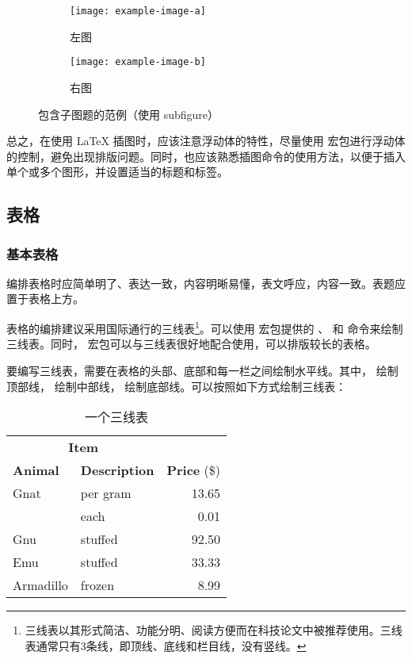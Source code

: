 \begin{figure}[!htp]
  \centering
  \begin{subfigure}{0.3\textwidth}
    \centering
    \texttt{[image: example-image-a]}
    \caption{左图}
  \end{subfigure}
  \hspace{1cm}
  \begin{subfigure}{0.4\textwidth}
    \centering
    \texttt{[image: example-image-b]}
    \caption{右图}
  \end{subfigure}
  \caption{包含子图题的范例（使用 subfigure）}
  \label{fig:subfigure}
\end{figure}



总之，在使用 \LaTeX{} 插图时，应该注意浮动体的特性，尽量使用  宏包进行浮动体的控制，避免出现排版问题。同时，也应该熟悉插图命令的使用方法，以便于插入单个或多个图形，并设置适当的标题和标签。


\subsection{表格}

\subsubsection{基本表格}

编排表格时应简单明了、表达一致，内容明晰易懂，表文呼应，内容一致。表题应置于表格上方。

表格的编排建议采用国际通行的三线表\footnote{三线表以其形式简洁、功能分明、阅读方便而在科技论文中被推荐使用。三线表通常只有3条线，即顶线、底线和栏目线，没有竖线。}。可以使用  宏包提供的 、 和  命令来绘制三线表。同时， 宏包可以与三线表很好地配合使用，可以排版较长的表格。

要编写三线表，需要在表格的头部、底部和每一栏之间绘制水平线。其中， 绘制顶部线， 绘制中部线， 绘制底部线。可以按照如下方式绘制三线表：
\begin{table}[!hpt]
  \caption{一个三线表}
  \label{tab:firstone}
  \centering
  \begin{tabular}{@{}llr@{}} \toprule
    \multicolumn{2}{c}{\textbf{Item}} \\ \cmidrule(r){1-2}
    \textbf{Animal} & \textbf{Description} & \textbf{Price} (\$)\\ \midrule
    Gnat  & per gram  & 13.65 \\
          & each      & 0.01 \\
    Gnu   & stuffed   & 92.50 \\
    Emu   & stuffed   & 33.33 \\
    Armadillo & frozen & 8.99 \\ \bottomrule
  \end{tabular}
\end{table}

